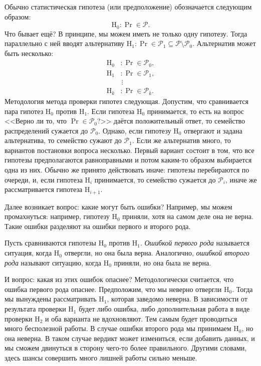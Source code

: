 Обычно статистическая гипотеза (или предположение) обозначается следующим образом:
\[
	\mathrm{H}_{0} \colon \Pr \in \mathcal{P}.
\]
Что бывает ещё? В принципе, мы можем иметь не только одну гипотезу. Тогда параллельно с ней вводят альтернативу $\mathrm{H}_{1} \colon \Pr \in \mathcal{P}_{1} \subseteq \mathcal{P} \setminus \mathcal{P}_{0}$. Альтернатив может быть несколько:
\begin{align*}
	\mathrm{H}_{0} &\colon \Pr \in \mathcal{P}_{0}, \\
	\mathrm{H}_{1} &\colon \Pr \in \mathcal{P}_{1}, \\
	&\,\vdots \\
	\mathrm{H}_{k} &\colon \Pr \in \mathcal{P}_{k}.
\end{align*}
Методология метода проверки гипотез следующая. Допустим, что сравнивается пара гипотез $\mathrm{H}_{0}$ против $\mathrm{H}_{1}$. Если гипотеза $\mathrm{H}_{0}$ принимается, то есть на вопрос <<Верно ли то, что $\Pr \in \mathcal{P}_{0}$?>> даётся положительный ответ, то семейство распределений сужается до $\mathcal{P}_{0}$. Однако, если гипотезу $\mathrm{H}_{0}$ отвергают и задана альтернатива, то семейство сужают до $\mathcal{P}_{1}$. Если же альтернатив много, то вариантов постановки вопроса несколько. Первый вариант состоит в том, что все гипотезы предполагаются равноправными и потом каким-то образом выбирается одна из них. Обычно же принято действовать иначе: гипотезы перебираются по очереди, и, если гипотеза $\mathrm{H}_{i}$ принимается, то семейство сужается до $\mathcal{P}_{i}$, иначе же рассматривается гипотеза $\mathrm{H}_{i + 1}$. 

Далее возникает вопрос: какие могут быть ошибки? Например, мы можем промахнуться: например, гипотезу $\mathrm{H}_{0}$ приняли, хотя на самом деле она не верна. Такие ошибки разделяют на ошибки первого и второго рода.
\begin{definition}
	Пусть сравниваются гипотезы $\mathrm{H}_{0}$ против $\mathrm{H}_{1}$. \emph{Ошибкой первого рода} называется ситуация, когда $\mathrm{H}_{0}$ отвергли, но она была верна. Аналогично, \emph{ошибкой второго рода} называют ситуацию, когда $\mathrm{H}_{0}$ приняли, но она была не верна.
\end{definition}
И вопрос: какая из этих ошибок опаснее? Методологически считается, что ошибка первого рода опаснее. Предположим, что мы неверно отвергли $\mathrm{H}_{0}$. Тогда мы вынуждены рассматривать $\mathrm{H}_{1}$, которая заведомо неверна. В зависимости от результата проверки $\mathrm{H}_{1}$ будет либо ошибка, либо дополнительная работа в виде проверки $\mathrm{H}_{2}$ и оба варианта не вдохновляют. Тем самым будет проводиться много бесполезной работы. В случае ошибки второго рода мы принимаем $\mathrm{H}_{0}$, но она неверна. В таком случае вердикт может измениться, если добавить данных, и мы сможем двинуться в сторону чего-то более правильного. Другими словами, здесь шансы совершить много лишней работы сильно меньше.

